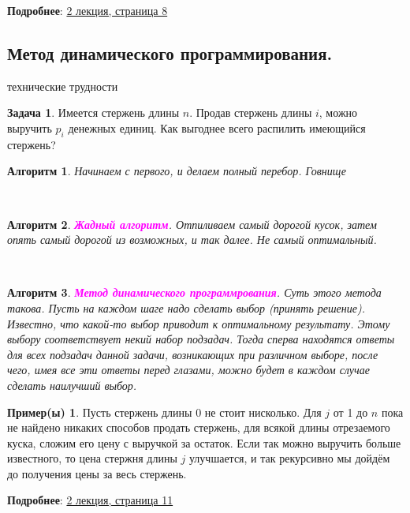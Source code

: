 \documentclass[a4paper]{article}
\theoremstyle{indented}
\newtheorem{alg}{Алгоритм}
\theoremstyle{definition}
\newtheorem{exl}{Пример(ы)}
\newtheorem{prob}{Задача}
\theoremstyle{remark}
\begin{document}
\textbf{Подробнее}: \href{https://users.math-cs.spbu.ru/~okhotin/teaching/algorithms_2020/okhotin_algorithms_2020_l2.pdf}{2 лекция, страница 8}

\subsection{Метод динамического программирования.}

\hypertarget{e1}{технические трудности}

\begin{prob}
    Имеется стержень длины $n$. Продав стержень длины $i$, можно выручить $p_i$ денежных единиц. Как выгоднее всего распилить имеющийся стержень?
\end{prob}

\begin{alg}
    Начинаем с первого, и делаем полный перебор. Говнище
\end{alg} \ 

\begin{alg}
    \textcolor{magenta}{\hypertarget{t6}{\textbf{Жадный алгоритм}}}. Отпиливаем самый дорогой кусок, затем опять самый дорогой из возможных, и так далее. Не самый оптимальный.
\end{alg} \ 

\begin{alg}
    \textcolor{magenta}{\hypertarget{t7}{\textbf{Метод динамического программрования}}}. Суть этого метода такова. Пусть на каждом шаге надо сделать выбор (принять решение). Известно, что какой-то выбор приводит к оптимальному результату. Этому выбору соответствует некий набор подзадач. Тогда сперва находятся ответы для всех подзадач данной задачи, возникающих при различном выборе, после чего, имея все эти ответы перед глазами, можно будет в каждом случае сделать наилучший выбор.
\end{alg}

\begin{exl}
    Пусть стержень длины 0 не стоит нисколько. Для $j$ от 1 до $n$ пока не найдено никаких способов продать стержень, для всякой длины отрезаемого куска, сложим его цену с выручкой за остаток. Если так можно выручить больше известного, то цена стержня длины $j$ улучшается, и так рекурсивно мы дойдём до получения цены за весь стержень. 
\end{exl}

\textbf{Подробнее}: \href{https://users.math-cs.spbu.ru/~okhotin/teaching/algorithms_2020/okhotin_algorithms_2020_l2.pdf}{2 лекция, страница 11}
\end{document}
